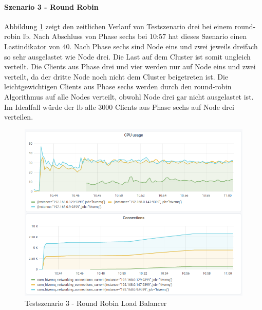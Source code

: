 \paragraph{Szenario 3 - Round Robin}
Abbildung \ref{fig:s3-rr} zeigt den zeitlichen Verlauf von Testszenario drei bei einem round-robin \ac{lb}.
Nach Abschluss von Phase sechs bei 10:57 hat dieses Szenario einen Lastindikator von 40.
Nach Phase sechs sind Node eins und zwei jeweils dreifach so sehr ausgelastet wie Node drei. Die Last auf dem Cluster ist somit ungleich verteilt.
Die Clients aus Phase drei und vier werden nur auf Node eins und zwei verteilt, da der dritte Node noch nicht dem Cluster beigetreten ist. Die leichtgewichtigen Clients aus Phase sechs werden durch den round-robin Algorithmus auf alle Nodes verteilt, obwohl Node drei gar nicht ausgelastet ist. Im Idealfall würde der \ac{lb} alle 3000 Clients aus Phase sechs auf Node drei verteilen.
\begin{figure}
    \centering
    \includegraphics[scale=0.8]{images/s3_rr.png}
    \caption{Testszenario 3 - Round Robin Load Balancer}
    \label{fig:s3-rr}
\end{figure}

